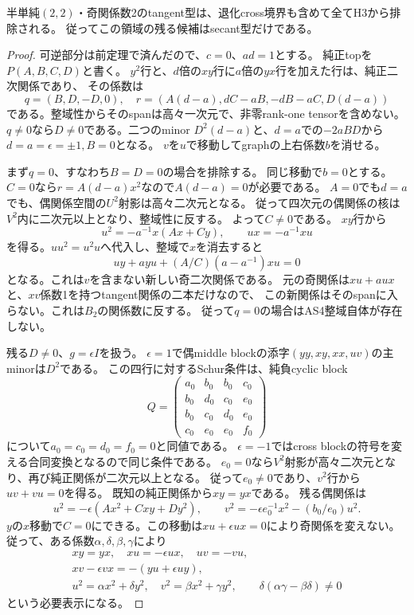 \begin{theorem}[退化境界と全tangent型の排除]
\label{thm:h3-order2-22-tangent-total-exclusion}
半単純$(2,2)$・奇関係数2のtangent型は、退化cross境界も含めて全てH3から排除される。
従ってこの領域の残る候補はsecant型だけである。
\end{theorem}
\begin{proof}
可逆部分は前定理で済んだので、$c=0$、$ad=1$とする。
純正topを$P(A,B,C,D)$と書く。
$y^2$行と、$d$倍の$xy$行に$a$倍の$yx$行を加えた行は、純正二次関係であり、
その係数は
\[
 q=(B,D,-D,0),\quad
 r=(A(d-a),dC-aB,-dB-aC,D(d-a))
\]
である。整域性からそのspanは高々一次元で、非零rank-one tensorを含めない。
$q\ne0$なら$D\ne0$である。二つのminor
$D^2(d-a)$と、$d=a$での$-2aBD$から$d=a=\epsilon=\pm1,B=0$となる。
$v$を$u$で移動してgraphの上右係数$b$を消せる。

まず$q=0$、すなわち$B=D=0$の場合を排除する。
同じ移動で$b=0$とする。
$C=0$なら$r=A(d-a)x^2$なので$A(d-a)=0$が必要である。
$A=0$でも$d=a$でも、偶関係空間の$U^2$射影は高々二次元となる。
従って四次元の偶関係の核は$V^2$内に二次元以上となり、整域性に反する。
よって$C\ne0$である。
$xy$行から
\[
 u^2=-a^{-1}x(Ax+Cy),\qquad ux=-a^{-1}xu
\]
を得る。$uu^2=u^2u$へ代入し、整域で$x$を消去すると
\[
 uy+a yu+(A/C)(a-a^{-1})xu=0
\]
となる。これは$v$を含まない新しい奇二次関係である。
元の奇関係は$xu+a ux$と、$xv$係数1を持つtangent関係の二本だけなので、
この新関係はそのspanに入らない。これは$B_2$の関係数に反する。
従って$q=0$の場合はAS4整域自体が存在しない。

残る$D\ne0$、$g=\epsilon I$を扱う。
$\epsilon=1$で偶middle blockの添字$(yy,xy,xx,uv)$の主minorは$D^2$である。
この四行に対するSchur条件は、純負cyclic block
\[
 Q=\begin{pmatrix}
 a_0&b_0&b_0&c_0\\b_0&d_0&c_0&e_0\\b_0&c_0&d_0&e_0\\c_0&e_0&e_0&f_0
 \end{pmatrix}
\]
について$a_0=c_0=d_0=f_0=0$と同値である。
$\epsilon=-1$ではcross blockの符号を変える合同変換となるので同じ条件である。
$e_0=0$なら$V^2$射影が高々二次元となり、再び純正関係が二次元以上となる。
従って$e_0\ne0$であり、$v^2$行から$uv+vu=0$を得る。
既知の純正関係から$xy=yx$である。
残る偶関係は
\[
 u^2=-\epsilon(Ax^2+Cxy+Dy^2),\qquad
 v^2=-\epsilon e_0^{-1}x^2-(b_0/e_0)u^2.
\]
$y$の$x$移動で$C=0$にできる。この移動は$x u+\epsilon ux=0$により奇関係を変えない。
従って、ある係数$\alpha,\delta,\beta,\gamma$により
\begin{gather*}
 xy=yx,\quad xu=-\epsilon ux,\quad uv=-vu,\\
 xv-\epsilon vx=-(yu+\epsilon uy),\\
 u^2=\alpha x^2+\delta y^2,\quad
 v^2=\beta x^2+\gamma y^2,\qquad
 \delta(\alpha\gamma-\beta\delta)\ne0
\end{gather*}
という必要表示になる。


\end{proof}
